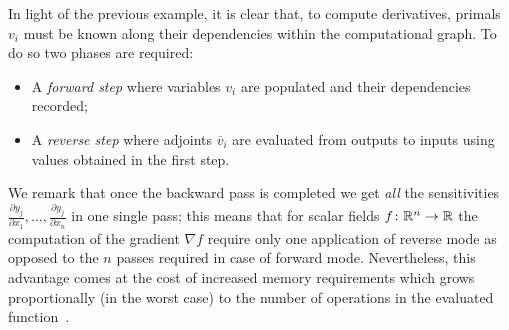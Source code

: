 \medskip
In light of the previous example, it is clear that, to compute derivatives, primals $v_i$ must be known along their dependencies within the computational graph. To do so two phases are required:
\begin{itemize}
	\item A \emph{forward step} where variables $v_i$ are populated and their dependencies recorded;
	\item A \emph{reverse step} where adjoints $\overline{v}_i$ are evaluated from outputs to inputs using values obtained in the first step.
\end{itemize}
We remark that once the backward pass is completed we get \emph{all} the sensitivities $\frac{\partial y_j}{\partial x_1}, \dots, \frac{\partial y_j}{\partial x_n}$ in one single pass; this means that for scalar fields $f \colon \mathbb{R}^n \to \mathbb{R}$ the computation of the gradient $\nabla f$ require only one application of reverse mode as opposed to the $n$ passes required in case of forward mode. Nevertheless, this advantage comes at the cost of increased memory requirements which grows proportionally (in the worst case) to the number of operations in the evaluated function~\cite{Baydin:AD_survey}.

